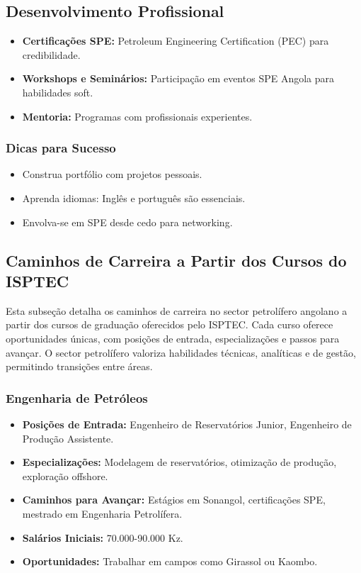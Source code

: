 \documentclass[12pt]{article}
\begin{document}
\subsection{Desenvolvimento Profissional}
\begin{itemize}
    \item \textbf{Certificações SPE:} Petroleum Engineering Certification (PEC) para credibilidade.
    \item \textbf{Workshops e Seminários:} Participação em eventos SPE Angola para habilidades soft.
    \item \textbf{Mentoria:} Programas com profissionais experientes.
\end{itemize}

\subsubsection{Dicas para Sucesso}
\begin{itemize}
    \item Construa portfólio com projetos pessoais.
    \item Aprenda idiomas: Inglês e português são essenciais.
    \item Envolva-se em SPE desde cedo para networking.
\end{itemize}

\subsection{Caminhos de Carreira a Partir dos Cursos do ISPTEC}

Esta subseção detalha os caminhos de carreira no sector petrolífero angolano a partir dos cursos de graduação oferecidos pelo ISPTEC. Cada curso oferece oportunidades únicas, com posições de entrada, especializações e passos para avançar. O sector petrolífero valoriza habilidades técnicas, analíticas e de gestão, permitindo transições entre áreas.

\subsubsection{Engenharia de Petróleos}
\begin{itemize}
    \item \textbf{Posições de Entrada:} Engenheiro de Reservatórios Junior, Engenheiro de Produção Assistente.
    \item \textbf{Especializações:} Modelagem de reservatórios, otimização de produção, exploração offshore.
    \item \textbf{Caminhos para Avançar:} Estágios em Sonangol, certificações SPE, mestrado em Engenharia Petrolífera.
    \item \textbf{Salários Iniciais:} 70.000-90.000 Kz.
    \item \textbf{Oportunidades:} Trabalhar em campos como Girassol ou Kaombo.
\end{itemize}
\end{document}
